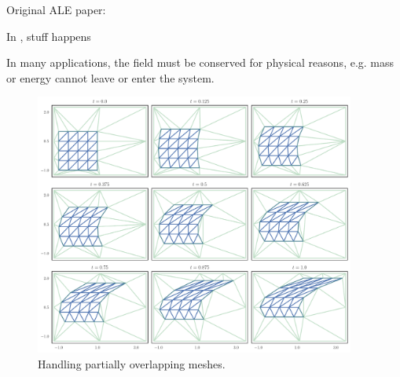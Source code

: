 


Original ALE paper: \cite{Hirt1974}

In \cite{Farrell2009, Farrell2011}, stuff happens

In many applications, the field must be conserved for physical reasons,
e.g. mass or energy cannot leave or enter the system.

\begin{figure}
  \includegraphics[width=0.9375\textwidth]
                  {../images/curved-mesh/mesh_distortion_ext.pdf}
  \centering
  \caption{Handling partially overlapping meshes.}
  \label{fig:mesh-distortion-ext}
\end{figure}

